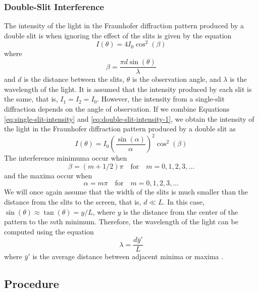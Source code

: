 \documentclass[10pt]{article}
\begin{document}
\subsubsection*{Double-Slit Interference}

The intensity of the light in the Fraunhofer diffraction pattern produced by a double slit is when ignoring the effect of the slits is given by the equation
\begin{equation}
  I(\theta) = 4 I_0 \cos^2(\beta)
  \label{eq:double-slit-intensity-1}
\end{equation}
where
\begin{equation}
  \beta = \frac{\pi d \sin(\theta)}{\lambda}
\end{equation}
and $d$ is the distance between the slits, $\theta$ is the observation angle, and $\lambda$ is the wavelength of the light. It is assumed that the intensity produced by each slit is the same, that is, $I_1 = I_2 = I_0$. However, the intensity from a single-slit diffraction depends on the angle of observation. If we combine Equations \eqref{eq:single-slit-intensity} and \eqref{eq:double-slit-intensity-1}, we obtain the intensity of the light in the Fraunhofer diffraction pattern produced by a double slit as
\begin{equation}
  I(\theta) = I_0 \left( \frac{\sin(\alpha)}{\alpha} \right)^2 \cos^2(\beta)
  \label{eq:double-slit-intensity-2}
\end{equation}
The interference minimuma occur when
\begin{equation}
  \beta = (m + 1/2) \pi \quad \text{for} \quad m = 0, 1, 2, 3, \ldots
\end{equation}
and the maxima occur when
\begin{equation}
  \alpha = m \pi \quad \text{for} \quad m = 0, 1, 2, 3, \ldots
\end{equation}  
We will once again assume that the width of the slits is much smaller than the distance from the slits to the screen, that is, $d \ll L$. In this case, $\sin(\theta) \approx \tan(\theta) = y/L$, where $y$ is the distance from the center of the pattern to the $m$th minimum. Therefore, the wavelength of the light can be computed using the equation
\begin{equation}
  \lambda = \frac{d \bar{y}'}{L}
\end{equation}
where $\bar{y}'$ is the average distance between adjacent minima or maxima \cite{Pedrotti_2006}.

\subsection*{Procedure} 
\end{document}
